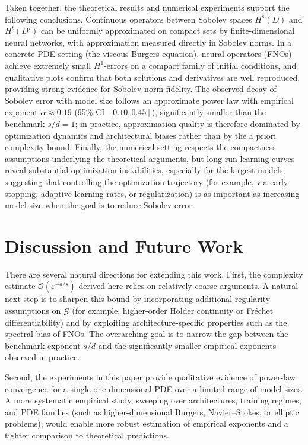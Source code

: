 \documentclass[11pt]{article}
\theoremstyle{plain}
\theoremstyle{definition}
\theoremstyle{remark}
\begin{document}
Taken together, the theoretical results and numerical experiments support the
following conclusions. Continuous operators between Sobolev spaces $H^s(D)$
and $H^t(D')$ can be uniformly approximated on compact sets by
finite-dimensional neural networks, with approximation measured directly in
Sobolev norms. In a concrete PDE setting (the viscous Burgers equation),
neural operators (FNOs) achieve extremely small $H^1$-errors on a compact
family of initial conditions, and qualitative plots confirm that both
solutions and derivatives are well reproduced, providing strong evidence for
Sobolev-norm fidelity. The observed decay of Sobolev error with model size
follows an approximate power law with empirical exponent $\alpha \approx 0.19$
(95\% CI $[0.10, 0.45]$), significantly smaller than the benchmark $s/d = 1$;
in practice, approximation quality is therefore dominated by optimization
dynamics and architectural biases rather than by the a priori complexity
bound. Finally, the numerical setting respects the compactness assumptions
underlying the theoretical arguments, but long-run learning curves reveal
substantial optimization instabilities, especially for the largest models,
suggesting that controlling the optimization trajectory (for example, via
early stopping, adaptive learning rates, or regularization) is as important as
increasing model size when the goal is to reduce Sobolev error.

\section{Discussion and Future Work}
\label{sec:discussion}
There are several natural directions for extending this work. First, the
complexity estimate $\mathcal{O}(\varepsilon^{-d/s})$ derived here relies on
relatively coarse arguments. A natural next step is to sharpen this bound by
incorporating additional regularity assumptions on $\mathcal{G}$ (for example,
higher-order H\"older continuity or Fr\'echet differentiability) and by
exploiting architecture-specific properties such as the spectral bias of FNOs.
The overarching goal is to narrow the gap between the benchmark exponent $s/d$
and the significantly smaller empirical exponents observed in practice.

Second, the experiments in this paper provide qualitative evidence of
power-law convergence for a single one-dimensional PDE over a limited range of
model sizes. A more systematic empirical study, sweeping over architectures,
training regimes, and PDE families (such as higher-dimensional Burgers,
Navier--Stokes, or elliptic problems), would enable more robust estimation of
empirical exponents and a tighter comparison to theoretical predictions.
\end{document}
